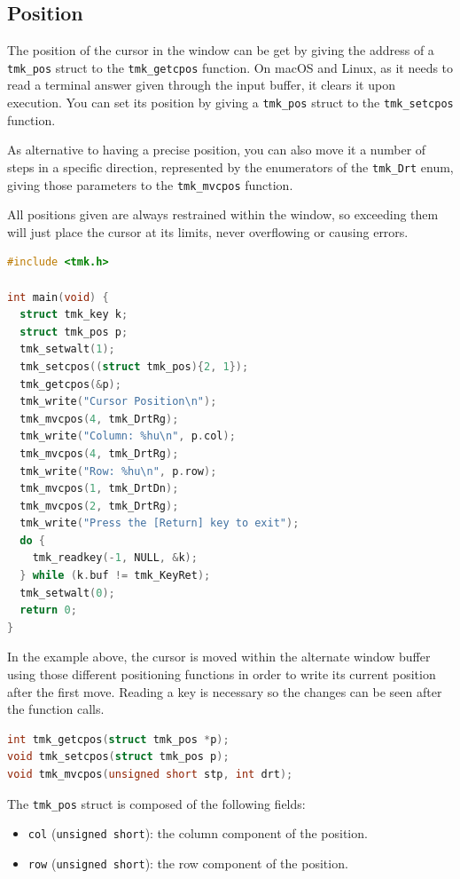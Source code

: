 \documentclass{report}
\begin{document}
\subsection{Position}
The position of the cursor in the window can be get by giving the address of a \texttt{tmk\_pos} struct to the \texttt{tmk\_getcpos} function. On macOS and Linux, as it needs to read a terminal answer given through the input buffer, it clears it upon execution. You can set its position by giving a \texttt{tmk\_pos} struct to the \texttt{tmk\_setcpos} function.

As alternative to having a precise position, you can also move it a number of steps in a specific direction, represented by the enumerators of the \texttt{tmk\_Drt} enum, giving those parameters to the \texttt{tmk\_mvcpos} function.

All positions given are always restrained within the window, so exceeding them will just place the cursor at its limits, never overflowing or causing errors.
\begin{lstlisting}[language=c,caption=an example that interacts with the cursor position in different ways.]
#include <tmk.h>

int main(void) {
  struct tmk_key k;
  struct tmk_pos p;
  tmk_setwalt(1);
  tmk_setcpos((struct tmk_pos){2, 1});
  tmk_getcpos(&p);
  tmk_write("Cursor Position\n");
  tmk_mvcpos(4, tmk_DrtRg);
  tmk_write("Column: %hu\n", p.col);
  tmk_mvcpos(4, tmk_DrtRg);
  tmk_write("Row: %hu\n", p.row);
  tmk_mvcpos(1, tmk_DrtDn);
  tmk_mvcpos(2, tmk_DrtRg);
  tmk_write("Press the [Return] key to exit");
  do {
    tmk_readkey(-1, NULL, &k);
  } while (k.buf != tmk_KeyRet);
  tmk_setwalt(0);
  return 0;
}
\end{lstlisting}

In the example above, the cursor is moved within the alternate window buffer using those different positioning functions in order to write its current position after the first move. Reading a key is necessary so the changes can be seen after the function calls.
\begin{lstlisting}[language=c,caption=the declarations of the cursor positioning function.]
int tmk_getcpos(struct tmk_pos *p);
void tmk_setcpos(struct tmk_pos p);
void tmk_mvcpos(unsigned short stp, int drt);
\end{lstlisting}

The \texttt{tmk\_pos} struct is composed of the following fields:
\begin{itemize}
  \item \texttt{col} (\texttt{unsigned short}): the column component of the position.
  \item \texttt{row} (\texttt{unsigned short}): the row component of the position.
\end{itemize}
\end{document}
